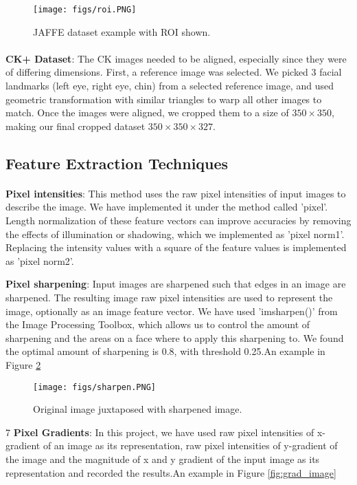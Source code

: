 \documentclass[10pt,twocolumn,letterpaper]{article}
\begin{document}
 \begin{figure}[h]
\texttt{[image: figs/roi.PNG]}
\caption{JAFFE dataset example with ROI shown.}
\label{fig:jaffe_roi_examples}
\end{figure}

\paragraph{}
\subitem \textbf{
CK+ Dataset}: The CK images needed to be aligned, especially since they were of differing dimensions. First, a reference image was selected. We picked 3 facial landmarks (left eye, right eye, chin) from a selected reference image, and used geometric transformation with similar triangles to warp all other images to match. Once the images were aligned, we cropped them to a size of $350\times350$, making our final cropped dataset $350\times350\times327$. 

\subsection{Feature Extraction Techniques}
\paragraph{}
\textbf{
Pixel intensities}: This method uses the raw pixel intensities of input images to describe the image. We have implemented it under the method called 'pixel'. Length normalization of these feature vectors can improve accuracies by removing the effects of illumination or shadowing, which we implemented as 'pixel norm1'. Replacing the intensity values with a square of the feature values is implemented as 'pixel norm2'. \newline

\textbf{
Pixel sharpening}: Input images are sharpened such that edges in an image are sharpened. The resulting image raw pixel intensities are used to represent the image, optionally as an image feature vector. We have used 'imsharpen()' from the Image Processing Toolbox, which allows us to control the amount of sharpening and the areas on a face where to apply this sharpening to. We found the optimal amount of sharpening is 0.8, with threshold 0.25.An example in Figure \ref{fig:sharp_image} \newline

\begin{figure}[h]
\texttt{[image: figs/sharpen.PNG]}
\caption{Original image juxtaposed with sharpened image.}
\label{fig:sharp_image}
\end{figure}
7
\textbf{
Pixel Gradients}: In this project, we have used raw pixel intensities of x-gradient of an image as its representation, raw pixel intensities of y-gradient of the image and the magnitude of x and y gradient of the input image as its representation and recorded the results.An example in Figure \ref{fig:grad_image} \newline
\end{document}

